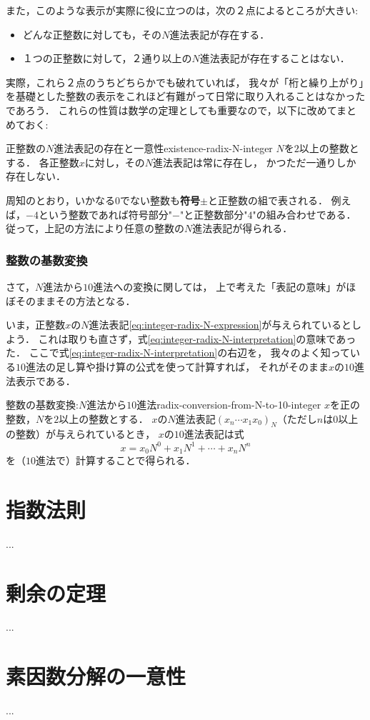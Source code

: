 \documentclass[a5j, uplatex, dvipdfmx]{jsbook}
\makeatletter
\newcommand{\ind}[2]{\textbf{#1}\index{#2@#1}}
\makeatother
\begin{document}
    また，このような表示が実際に役に立つのは，次の２点によるところが大きい:

    \begin{itemize}
        \item どんな正整数に対しても，その$N$進法表記が存在する．
        \item １つの正整数に対して，２通り以上の$N$進法表記が存在することはない．
    \end{itemize}

    実際，これら２点のうちどちらかでも破れていれば，
    我々が「桁と繰り上がり」を基礎とした整数の表示をこれほど有難がって日常に取り入れることはなかったであろう．
    これらの性質は数学の定理としても重要なので，以下に改めてまとめておく:

    \begin{thm}{正整数の$N$進法表記の存在と一意性}{existence-radix-N-integer}
        $N$を$2$以上の整数とする．
        各正整数$x$に対し，その$N$進法表記は常に存在し，
        かつただ一通りしか存在しない．
    \end{thm}

    周知のとおり，いかなる$0$でない整数も\ind{符号}{ふごう}$\pm$と正整数の組で表される．
    例えば，$-4$という整数であれば符号部分"$-$"と正整数部分"$4$"の組み合わせである．
    従って，上記の方法により任意の整数の$N$進法表記が得られる．

\subsection{整数の基数変換}
    さて，$N$進法から$10$進法への変換に関しては，
    上で考えた「表記の意味」がほぼそのままその方法となる．

    いま，正整数$x$の$N$進法表記\eqref{eq:integer-radix-N-expression}が与えられているとしよう．
    これは取りも直さず，式\eqref{eq:integer-radix-N-interpretation}の意味であった．
    ここで式\eqref{eq:integer-radix-N-interpretation}の右辺を，
    我々のよく知っている$10$進法の足し算や掛け算の公式を使って計算すれば，
    それがそのまま$x$の$10$進法表示である．
    
    \begin{meth}{整数の基数変換:$N$進法から$10$進法}{radix-conversion-from-N-to-10-integer}
        $x$を正の整数，$N$を$2$以上の整数とする．
        $x$の$N$進法表記$(x_n \cdots x_1 x_0)_N$（ただし$n$は$0$以上の整数）が与えられているとき，
        $x$の$10$進法表記は式
        \begin{equation*}
            x = x_0 N^0 + x_1 N^1 + \cdots + x_n N^n
        \end{equation*}
        を（$10$進法で）計算することで得られる．
    \end{meth}
    
\appendix
\chapter{指数法則}
    ...

\chapter{剰余の定理}
    ...

\chapter{素因数分解の一意性}
    ...
\end{document}

